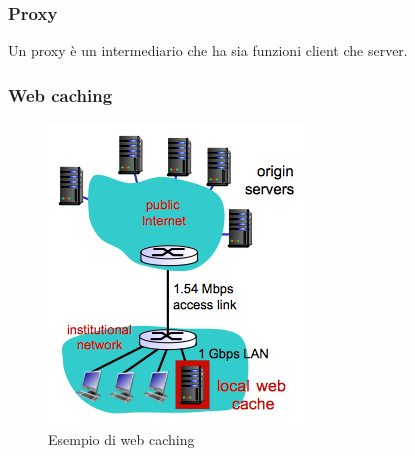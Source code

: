 \subsubsection{Proxy}
Un proxy è un intermediario che ha sia funzioni client che server.
\subsubsection{Web caching}
\begin{figure}[h!]
    \centering
    \includegraphics[width=0.3\linewidth]{imgs/2 - web cache.png}
    \caption{Esempio di web caching}
    \label{fig:WebCache}
\end{figure}